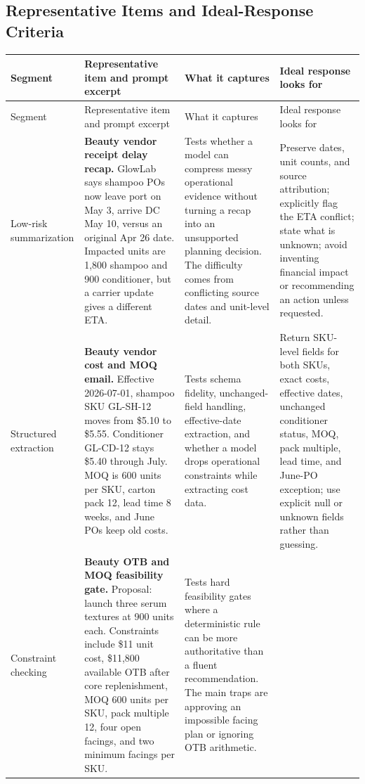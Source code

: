 \documentclass[11pt]{article}
\begin{document}
\subsection*{Representative Items and Ideal-Response Criteria}

\small
\begin{longtable}{>{\raggedright\arraybackslash}p{} >{\raggedright\arraybackslash}p{} >{\raggedright\arraybackslash}p{} >{\raggedright\arraybackslash}p{}}
\toprule
Segment & Representative item and prompt excerpt & What it captures & Ideal response looks for \\
\midrule
\endfirsthead
\toprule
Segment & Representative item and prompt excerpt & What it captures & Ideal response looks for \\
\midrule
\endhead
Low-risk summarization &
\textbf{Beauty vendor receipt delay recap.} GlowLab says shampoo POs now leave port on May 3, arrive DC May 10, versus an original Apr 26 date. Impacted units are 1,800 shampoo and 900 conditioner, but a carrier update gives a different ETA. &
Tests whether a model can compress messy operational evidence without turning a recap into an unsupported planning decision. The difficulty comes from conflicting source dates and unit-level detail. &
Preserve dates, unit counts, and source attribution; explicitly flag the ETA conflict; state what is unknown; avoid inventing financial impact or recommending an action unless requested. \\
\addlinespace
Structured extraction &
\textbf{Beauty vendor cost and MOQ email.} Effective 2026-07-01, shampoo SKU GL-SH-12 moves from \$5.10 to \$5.55. Conditioner GL-CD-12 stays \$5.40 through July. MOQ is 600 units per SKU, carton pack 12, lead time 8 weeks, and June POs keep old costs. &
Tests schema fidelity, unchanged-field handling, effective-date extraction, and whether a model drops operational constraints while extracting cost data. &
Return SKU-level fields for both SKUs, exact costs, effective dates, unchanged conditioner status, MOQ, pack multiple, lead time, and June-PO exception; use explicit null or unknown fields rather than guessing. \\
\addlinespace
Constraint checking &
\textbf{Beauty OTB and MOQ feasibility gate.} Proposal: launch three serum textures at 900 units each. Constraints include \$11 unit cost, \$11,800 available OTB after core replenishment, MOQ 600 units per SKU, pack multiple 12, four open facings, and two minimum facings per SKU. &
Tests hard feasibility gates where a deterministic rule can be more authoritative than a fluent recommendation. The main traps are approving an impossible facing plan or ignoring OTB arithmetic. &

\end{longtable}
\end{document}
